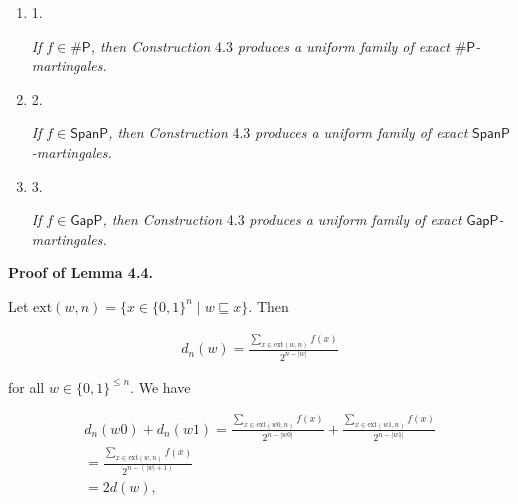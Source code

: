 \begin{enumerate}


\item[] 
1. 


\emph{If }$f\in{\mathsf{\#}\mathsf{P}}$\emph{, then Construction }4.3\emph{
produces a uniform family of exact }${\mathsf{\#}\mathsf{P}}$\emph{-martingales.}\par





\item[] 
2. 


\emph{If }$f\in\mathsf{SpanP}$\emph{, then Construction }4.3\emph{
produces a uniform family of exact }$\mathsf{SpanP}$\emph{-martingales.}\par





\item[] 
3. 


\emph{If }$f\in\mathsf{GapP}$\emph{, then Construction }4.3\emph{
produces a uniform family of exact }$\mathsf{GapP}$\emph{-martingales.}\par





\end{enumerate}






\par\medskip\noindent\textbf{Proof of Lemma 4.4.}\par




Let $\mathrm{ext}(w,n)=\{x\in\{0,1\}^{n}\mid w\sqsubseteq x\}$.
Then\par


\[\begin{gathered}
d_{n}(w)=\frac{\sum\limits_{x\in\mathrm{ext}(w,n)}f(x)}{2^{n-|w|}}
\end{gathered}\]


for all
$w\in\{0,1\}^{\leq n}.$
We have\par


\[\begin{gathered}
\displaystyle d_{n}(w0)+d_{n}(w1) \displaystyle= \displaystyle\frac{\sum\limits_{x\in\mathrm{ext}(w0,n)}f(x)}{2^{n-|w0|}}+\frac{\sum\limits_{x\in\mathrm{ext}(w1,n)}f(x)}{2^{n-|w1|}} \\
\displaystyle= \displaystyle\frac{\sum\limits_{x\in\mathrm{ext}(w,n)}f(x)}{2^{n-(|w|+1)}} \\
\displaystyle= \displaystyle 2d(w),
\end{gathered}\]


